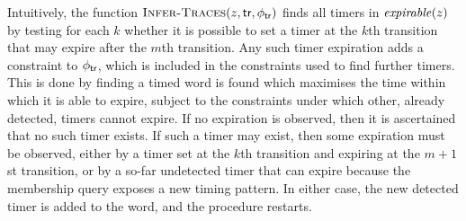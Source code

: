 Intuitively, the function
$\textsc{Infer-Traces}(z,\textsf{tr},\phi_{\textsf{tr}})$ finds
all timers in $\mathit{expirable}(z)$ by testing for each $k$ whether 
it is possible
to set a timer at the $k$th transition that may expire after the
$m$th transition. Any such timer expiration adds a constraint to
$\phi_{\textsf{tr}}$, which is included in the constraints used to find
further timers.
This is done by finding a timed word is found which maximises the
time within which it is able to expire, subject to the constraints under
which other, already detected, timers cannot expire. If no expiration is
observed, then it is ascertained that no such timer exists.
If such a timer may exist, then some expiration must be observed, either
by a timer set at the $k$th transition and expiring at the $m+1$st transition,
or by a so-far undetected timer that can expire because the membership
query exposes a new timing pattern. In either case, the new detected timer
is added to the word, and the procedure restarts.



